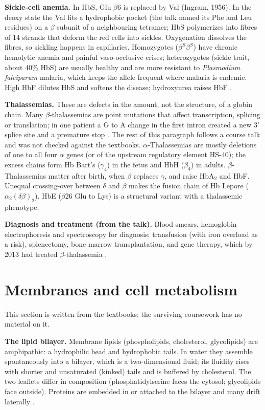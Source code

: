 \textbf{Sickle-cell anemia.}
In HbS, Glu $\beta$6 is replaced by Val
(Ingram, 1956). In the deoxy state the Val
fits a hydrophobic pocket (the talk named its
Phe and Leu residues) on a $\beta$ subunit of
a neighbouring tetramer; HbS polymerizes into
fibres of 14 strands that deform the red
cells into sickles. Oxygenation dissolves the
fibres, so sickling happens in capillaries.
Homozygotes ($\beta^S\beta^S$) have chronic
hemolytic anemia and painful vaso-occlusive
crises; heterozygotes (sickle trait, about
40\% HbS) are usually healthy and are more
resistant to \emph{Plasmodium falciparum}
malaria, which keeps the allele frequent
where malaria is endemic. High HbF dilutes
HbS and softens the disease; hydroxyurea
raises HbF \cite[Section
7-1]{voet2013fundamentals}.

\textbf{Thalassemias.}
These are defects in the amount, not the
structure, of a globin chain. Many
$\beta$-thalassemias are point mutations that
affect transcription, splicing or
translation; in one patient a G to A change
in the first intron created a new 3' splice
site and a premature stop \cite[Section
28.3.3]{bergbiochemistry}. The rest of
this paragraph follows a course talk and was
not checked against the textbooks.
$\alpha$-Thalassemias are mostly deletions of
one to all four $\alpha$ genes (or of the
upstream regulatory element HS-40); the
excess chains form Hb Bart's ($\gamma_4$) in
the fetus and HbH ($\beta_4$) in adults.
$\beta$-Thalassemias matter after birth, when
$\beta$ replaces $\gamma$, and raise HbA$_2$
and HbF. Unequal crossing-over between
$\delta$ and $\beta$ makes the fusion chain
of Hb Lepore ($\alpha_2(\delta\beta)_2$). HbE
($\beta$26 Glu to Lys) is a structural
variant with a thalassemic phenotype.

\textbf{Diagnosis and treatment (from the
talk).}
Blood smears, hemoglobin electrophoresis and
spectroscopy for diagnosis; transfusion (with
iron overload as a risk), splenectomy, bone
marrow transplantation, and gene therapy,
which by 2013 had treated $\beta$-thalassemia
\cite[Section 3-5]{voet2013fundamentals}.

\section{Membranes and cell metabolism}
\label{section-mcb-membranes-metabolism}

This section is written from the textbooks;
the surviving coursework has no material on
it.

\textbf{The lipid bilayer.}
Membrane lipids (phospholipids, cholesterol,
glycolipids) are amphipathic: a hydrophilic
head and hydrophobic tails. In water they
assemble spontaneously into a bilayer, which
is a two-dimensional fluid; its fluidity
rises with shorter and unsaturated (kinked)
tails and is buffered by cholesterol. The two
leaflets differ in composition
(phosphatidylserine faces the cytosol;
glycolipids face outside). Proteins are
embedded in or attached to the bilayer and
many drift laterally \cite[Chapter
11]{alberts2014essential}.

